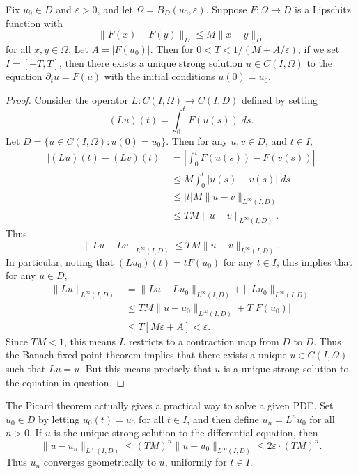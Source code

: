 \begin{theorem}[Picard]
    Fix $u_0 \in D$ and $\varepsilon > 0$, and let $\Omega = B_D(u_0,\varepsilon)$. Suppose $F: \Omega \to D$ is a Lipschitz function with
    \[ \| F(x) - F(y) \|_D \leq M \| x - y \|_D \]
    for all $x,y \in \Omega$. Let $A = |F(u_0)|$. Then for $0 < T < 1/(M + A/\varepsilon)$, if we set $I = [-T,T]$, then there exists a unique strong solution $u \in C(I,\Omega)$ to the equation $\partial_t u = F(u)$ with the initial conditions $u(0) = u_0$.
\end{theorem}
\begin{proof}
    Consider the operator $L: C(I,\Omega) \to C(I,D)$ defined by setting
    \[ (Lu)(t) = \int_0^t F(u(s))\; ds. \]
    Let $D = \{ u \in C(I,\Omega) : u(0) = u_0 \}$. Then for any $u,v \in D$, and $t \in I$,
    \begin{align*}
        |(Lu)(t) - (Lv)(t)| &= \left| \int_0^t F(u(s)) - F(v(s)) \right|\\
        &\leq M \int_0^t |u(s) - v(s)|\; ds\\
        &\leq |t| M \| u - v \|_{L^\infty(I,D)}\\
        &\leq T M \| u - v \|_{L^\infty(I,D)}.
    \end{align*}
    Thus
    \[ \| Lu - Lv \|_{L^\infty(I,D)} \leq TM \| u - v \|_{L^\infty(I,D)}. \]
    In particular, noting that $(Lu_0)(t) = t F(u_0)$ for any $t \in I$, this implies that for any $u \in D$,
    \begin{align*}
        \| Lu \|_{L^\infty(I,D)} &= \| Lu - Lu_0 \|_{L^\infty(I,D)} + \| Lu_0 \|_{L^\infty(I,D)}\\
        &\leq TM \| u - u_0 \|_{L^\infty(I,D)} + T |F(u_0)|\\
        &\leq T[M \varepsilon + A] < \varepsilon.
    \end{align*}
    Since $TM < 1$, this means $L$ restricts to a contraction map from $D$ to $D$. Thus the Banach fixed point theorem implies that there exists a unique $u \in C(I,\Omega)$ such that $Lu = u$. But this means precisely that $u$ is a unique strong solution to the equation in question.
\end{proof}

\begin{remark}
    The Picard theorem actually gives a practical way to solve a given PDE. Set $u_0 \in D$ by letting $u_0(t) = u_0$ for all $t \in I$, and then define $u_n = L^n u_0$ for all $n > 0$. If $u$ is the unique strong solution to the differential equation, then
    \[ \| u - u_n \|_{L^\infty(I,D)} \leq (TM)^n \| u - u_0 \|_{L^\infty(I,D)} \leq 2 \varepsilon \cdot (TM)^n. \]
    Thus $u_n$ converges geometrically to $u$, uniformly for $t \in I$.
\end{remark}

